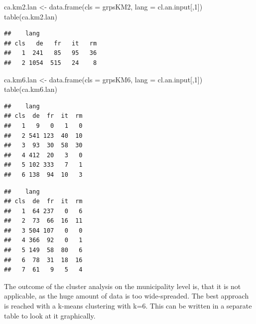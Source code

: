 \documentclass[
]{article}
\newenvironment{Shaded}{\begin{snugshade}}{\end{snugshade}}
\newcommand{\AttributeTok}[1]{\textcolor[rgb]{0.77,0.63,0.00}{#1}}
\newcommand{\DecValTok}[1]{\textcolor[rgb]{0.00,0.00,0.81}{#1}}
\newcommand{\FunctionTok}[1]{\textcolor[rgb]{0.00,0.00,0.00}{#1}}
\newcommand{\NormalTok}[1]{#1}
\newcommand{\OtherTok}[1]{\textcolor[rgb]{0.56,0.35,0.01}{#1}}
\newcommand{\SpecialCharTok}[1]{\textcolor[rgb]{0.00,0.00,0.00}{#1}}
\begin{document}
\begin{Shaded}
\begin{Highlighting}[]
\NormalTok{ca.km2.lan }\OtherTok{\textless{}{-}} \FunctionTok{data.frame}\NormalTok{(}\AttributeTok{cls =}\NormalTok{ grpsKM2, }\AttributeTok{lang =}\NormalTok{ cl.an.input[,}\DecValTok{1}\NormalTok{])}
\FunctionTok{table}\NormalTok{(ca.km2.lan)}
\end{Highlighting}
\end{Shaded}

\begin{verbatim}
##    lang
## cls   de   fr   it   rm
##   1  241   85   95   36
##   2 1054  515   24    8
\end{verbatim}

\begin{Shaded}
\begin{Highlighting}[]
\NormalTok{ca.km6.lan }\OtherTok{\textless{}{-}} \FunctionTok{data.frame}\NormalTok{(}\AttributeTok{cls =}\NormalTok{ grpsKM6, }\AttributeTok{lang =}\NormalTok{ cl.an.input[,}\DecValTok{1}\NormalTok{])}
\FunctionTok{table}\NormalTok{(ca.km6.lan)}
\end{Highlighting}
\end{Shaded}

\begin{verbatim}
##    lang
## cls  de  fr  it  rm
##   1   9   0   1   0
##   2 541 123  40  10
##   3  93  30  58  30
##   4 412  20   3   0
##   5 102 333   7   1
##   6 138  94  10   3
\end{verbatim}

\begin{Shaded}
\end{Shaded}

\begin{verbatim}
##    lang
## cls  de  fr  it  rm
##   1  64 237   0   6
##   2  73  66  16  11
##   3 504 107   0   0
##   4 366  92   0   1
##   5 149  58  80   6
##   6  78  31  18  16
##   7  61   9   5   4
\end{verbatim}

The outcome of the cluster analysis on the municipality level is, that
it is not applicable, as the huge amount of data is too wide-spreaded.
The best approach is reached with a k-means clustering with k=6. This
can be written in a separate table to look at it graphically.
\end{document}
